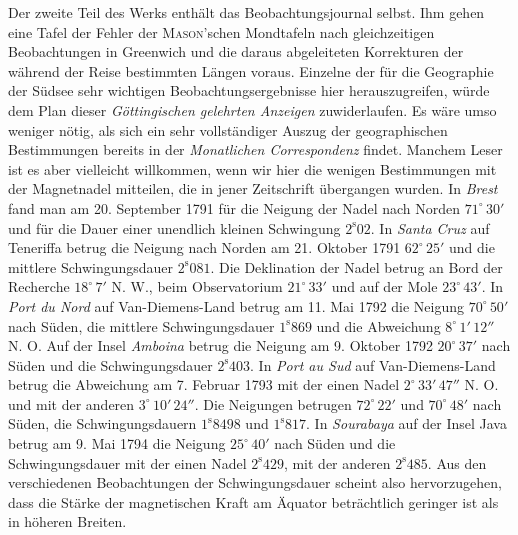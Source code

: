 Der zweite Teil des Werks enthält das Beobachtungsjournal selbst. Ihm gehen eine Tafel der Fehler der \textsc{Mason}'schen Mondtafeln nach gleichzeitigen Beobachtungen in Greenwich und die daraus abgeleiteten Korrekturen der während der Reise bestimmten Längen voraus. Einzelne der für die Geographie der Südsee sehr wichtigen Beobachtungsergebnisse hier herauszugreifen, würde dem Plan dieser \emph{Göttingischen gelehrten Anzeigen} zuwiderlaufen. Es wäre umso weniger nötig, als sich ein sehr vollständiger Auszug der geographischen Bestimmungen bereits in der \emph{Monatlichen Correspondenz} findet. Manchem Leser ist es aber vielleicht willkommen, wenn wir hier die wenigen Bestimmungen mit der Magnetnadel mitteilen, die in jener Zeitschrift übergangen wurden. In \emph{Brest} fand man am 20. September 1791 für die Neigung der Nadel nach Norden $71^\circ\,30'$ und für die Dauer einer unendlich kleinen Schwingung $2^{\mathrm s}02$. In \emph{Santa Cruz} auf Teneriffa betrug die Neigung nach Norden am 21. Oktober 1791 $62^\circ\,25'$ und die mittlere Schwingungsdauer $2^{\mathrm s}081$. Die Deklination der Nadel betrug an Bord der Recherche $18^\circ\,7'$ N. W., beim Observatorium $21^\circ\,33'$ und auf der Mole $23^\circ\,43'$. In \emph{Port du Nord} auf Van-Diemens-Land betrug am 11. Mai 1792 die Neigung $70^\circ\,50'$ nach Süden, die mittlere Schwingungsdauer $1^{\mathrm s}869$ und die Abweichung $8^\circ\,1'\,12''$ N. O. Auf der Insel \emph{Amboina} betrug die Neigung am 9. Oktober 1792 $20^\circ\,37'$ nach Süden und die Schwingungsdauer $2^{\mathrm s}403$. In \emph{Port au Sud} auf Van-Diemens-Land betrug die Abweichung am 7. Februar 1793 mit der einen Nadel $2^\circ\,33'\,47''$ N. O. und mit der anderen $3^\circ\,10'\,24''$. Die Neigungen betrugen $72^\circ\,22'$ und $70^\circ\,48'$ nach Süden, die Schwingungsdauern $1^{\mathrm s}8498$ und $1^{\mathrm s}817$. In \emph{Sourabaya} auf der Insel Java betrug am 9. Mai 1794 die Neigung $25^\circ\,40'$ nach Süden und die Schwingungsdauer mit der einen Nadel $2^{\mathrm s}429$, mit der anderen $2^{\mathrm s}485$. Aus den verschiedenen Beobachtungen der Schwingungsdauer scheint also hervorzugehen, dass die Stärke der magnetischen Kraft am Äquator beträchtlich geringer ist als in höheren Breiten.
